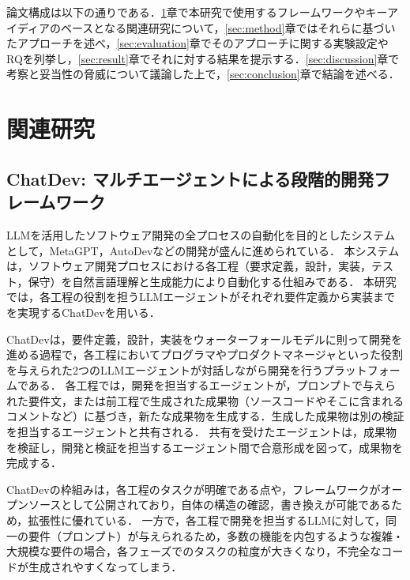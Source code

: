 \documentclass[submit,techrep,noauthor]{ipsj}
\begin{document}
論文構成は以下の通りである．\ref{sec:related}章で本研究で使用するフレームワークやキーアイディアのベースとなる関連研究について，\ref{sec:method}章ではそれらに基づいたアプローチを述べ，\ref{sec:evaluation}章でそのアプローチに関する実験設定やRQを列挙し，\ref{sec:result}章でそれに対する結果を提示する．\ref{sec:discussion}章で考察と妥当性の脅威について議論した上で，\ref{sec:conclusion}章で結論を述べる．


\section{関連研究}
\label{sec:related}

\subsection{ChatDev: マルチエージェントによる段階的開発フレームワーク}
LLMを活用したソフトウェア開発の全プロセスの自動化を目的としたシステムとして，MetaGPT，AutoDevなどの開発が盛んに進められている\cite{metagpt}\cite{autodev}．
本システムは，ソフトウェア開発プロセスにおける各工程（要求定義，設計，実装，テスト，保守）を自然言語理解と生成能力により自動化する仕組みである．
本研究では，各工程の役割を担うLLMエージェントがそれぞれ要件定義から実装までを実現するChatDev\cite{qian-etal-2024-chatdev}を用いる．

ChatDevは，要件定義，設計，実装をウォーターフォールモデルに則って開発を進める過程で，各工程においてプログラマやプロダクトマネージャといった役割を与えられた2つのLLMエージェントが対話しながら開発を行うプラットフォームである．
各工程では，開発を担当するエージェントが，プロンプトで与えられた要件文，または前工程で生成された成果物（ソースコードやそこに含まれるコメントなど）に基づき，新たな成果物を生成する．生成した成果物は別の検証を担当するエージェントと共有される．
共有を受けたエージェントは，成果物を検証し，開発と検証を担当するエージェント間で合意形成を図って，成果物を完成する．

ChatDevの枠組みは，各工程のタスクが明確である点や，フレームワークがオープンソースとして公開されており，自体の構造の確認，書き換えが可能であるため，拡張性に優れている．
一方で，各工程で開発を担当するLLMに対して，同一の要件（プロンプト）が与えられるため，多数の機能を内包するような複雑・大規模な要件の場合，各フェーズでのタスクの粒度が大きくなり，不完全なコードが生成されやすくなってしまう．


\end{document}
